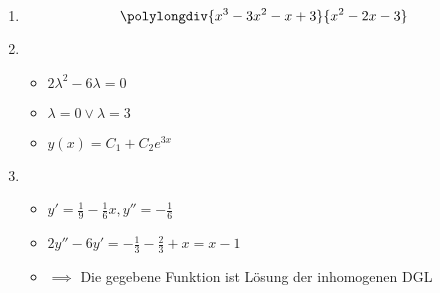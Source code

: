\item 
\begin{enumerate}

\item
\[\polylongdiv{x^3-3x^2-x+3}{x^2-2x-3}\]

\item 
\begin{itemize}
\item $2\lambda^2-6\lambda = 0$
\item $\lambda = 0 \lor \lambda = 3$
\item $y(x) = C_1 + C_2 e^{3x}$
\end{itemize}

\item 
\begin{itemize}
\item $y' = \frac{1}{9}-\frac{1}{6}x, y'' = -\frac{1}{6}$
\item $2y'' - 6y' = -\frac{1}{3} - \frac{2}{3} + x = x -1$
\item $\implies$ Die gegebene Funktion ist Lösung der inhomogenen DGL
\end{itemize}

\end{enumerate}
